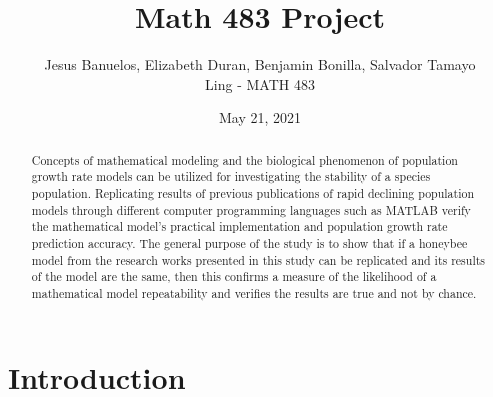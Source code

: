 \documentclass[a4paper,10pt]{article}
\begin{document}
%
   \title{Math 483 Project}

   \author{Jesus Banuelos, Elizabeth Duran, Benjamin Bonilla, Salvador Tamayo \\ Ling - MATH 483 }
          
   \date{May 21, 2021}

   \maketitle
   
   \tableofcontents
 
   \newpage
{}
\begin{abstract}
Concepts of mathematical modeling and the biological phenomenon of population
growth rate models can be utilized for investigating the stability of a species
population. Replicating results of previous publications of rapid declining
population models through different computer programming languages such as MATLAB
verify the mathematical model's practical implementation and population growth
rate prediction accuracy. The general purpose of the study is to show that if a
honeybee model from the research works presented in this study can be replicated
and its results of the model are the same, then this confirms a measure of the
likelihood of a mathematical model repeatability and verifies the results are
true and not by chance.
\end{abstract}
\section{Introduction}
\end{document}
